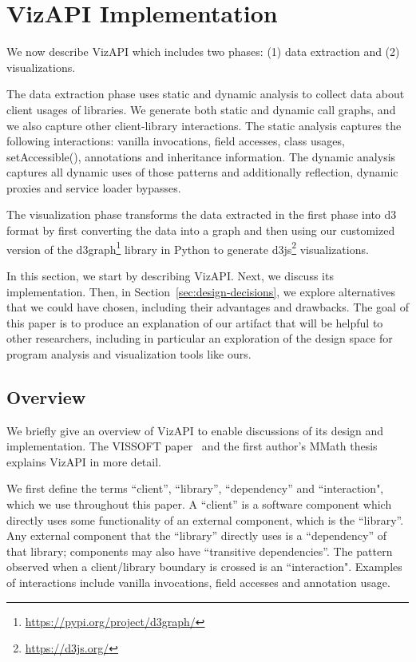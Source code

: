 \section{VizAPI Implementation}
\label{sec:implementation}
We now describe VizAPI which includes two phases: (1) data extraction and (2) visualizations. 

The data extraction phase uses static and dynamic
analysis to collect data about client usages of libraries. We generate both static and
dynamic call graphs, and we also capture other client-library interactions. The static analysis captures the
following interactions: vanilla invocations, field accesses, class usages,
setAccessible(), annotations and inheritance information. The dynamic
analysis captures all dynamic uses of those patterns and additionally
reflection, dynamic proxies and service loader bypasses.

The visualization phase transforms the data extracted in the first phase into d3 format by first converting the data into a graph and then using our customized version
of the d3graph\footnote{\url{https://pypi.org/project/d3graph/}} library in Python to generate d3js\footnote{\url{https://d3js.org/}} visualizations. 

In this section, we start by describing VizAPI. Next, we discuss its implementation. Then, in Section~\ref{sec:design-decisions}, we explore
alternatives that we could have chosen, including their advantages and
drawbacks.  The goal of this paper is to produce an explanation of our
artifact that will be helpful to other researchers, including in
particular an exploration of the design space for program analysis and visualization tools like ours.

\subsection{Overview}
We briefly give an overview of VizAPI to enable discussions of its design and implementation.
The VISSOFT paper~\cite{venkatanarayanan22:_vizap}
and the first author's MMath thesis~\cite{venkatanarayanan22:_study_lever_api_usage_patter} explains VizAPI in more detail.

We first define the terms ``client'', ``library'', ``dependency'' and ``interaction", which we use throughout this paper. A ``client'' is a software component which directly uses some functionality of an external component, which is the ``library''. Any external component that the ``library'' directly uses is a ``dependency'' of that library; components may also have ``transitive dependencies''. The pattern observed when a client/library boundary is crossed is an ``interaction". Examples of interactions include vanilla invocations, field accesses and annotation usage.

